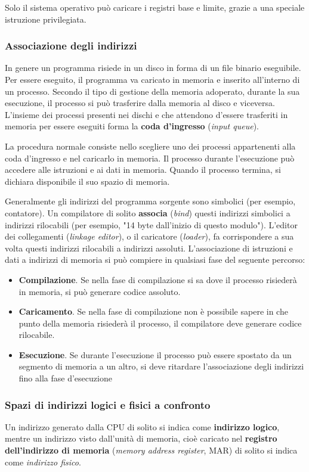 \documentclass[11pt,a4paper]{article}
\begin{document}
Solo il sistema operativo può caricare i registri base e limite, grazie a una speciale istru­zione privilegiata.

\subsubsection{Associazione degli indirizzi}
In genere un programma risiede in un disco in forma di un file binario eseguibile. Per essere
eseguito, il programma va caricato in memoria e inserito all'interno di un processo. Secondo il
tipo di gestione della memoria adoperato, durante la sua esecuzione, il processo si può trasfe­rire dalla memoria al disco e viceversa. L'insieme dei processi presenti nei dischi e che attendo­no d'essere trasferiti in memoria per essere eseguiti forma la \textbf{coda d'ingresso} (\emph{input queue}).

La procedura normale consiste nello scegliere uno dei processi appartenenti alla coda
d'ingresso e nel caricarlo in memoria. Il processo durante l'esecuzione può accedere alle
istruzioni e ai dati in memoria. Quando il processo termina, si dichiara disponibile il suo
spazio di memoria.

Generalmente gli indirizzi del programma sorgente sono simboli­ci (per esempio, contatore). Un compilatore di solito \textbf{associa} (\emph{bind}) questi indirizzi simboli­ci a indirizzi rilocabili (per esempio, "14 byte dall'inizio di questo modulo"). L'editor dei
collegamenti (\emph{linkage editor}), o il caricatore (\emph{loader}), fa corrispondere a sua volta questi indi­rizzi rilocabili a indirizzi assoluti.
L'associazione di istruzioni e dati a indirizzi di memoria si può compie­re in qualsiasi fase del seguente percorso:
\begin{itemize}
  \item \textbf{Compilazione}. Se nella fase di compilazione si sa dove il processo risiederà in memo­ria, si può generare codice assoluto.
  \item \textbf{Caricamento}. Se nella fase di compilazione non è possibile sapere in che punto della me­moria risiederà il processo, il compilatore deve generare codice rilocabile.
  \item \textbf{Esecuzione}. Se durante l'esecuzione il processo può essere spostato da un segmento di memoria a un altro, si deve ritardare l'associazione degli indirizzi fino alla fase d'esecu­zione
\end{itemize}

\subsubsection{Spazi di indirizzi logici e fisici a confronto}
Un indirizzo generato dalla CPU di solito si indica come \textbf{indirizzo logico}, mentre un indi­rizzo visto dall'unità di memoria, cioè caricato nel \textbf{registro dell'indirizzo di memoria}
(\emph{memory address register}, MAR) di solito si indica come \emph{indirizzo fisico}.
\end{document}
